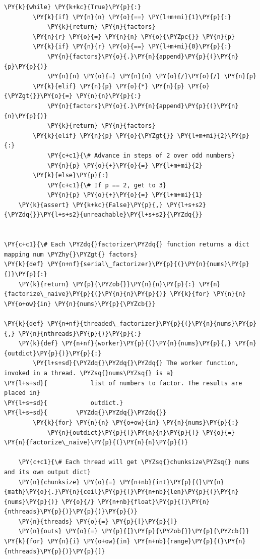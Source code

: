 \begin{Verbatim}[label=\makebox{\url{https://github.com/lucabaldini/cmepda/tree/master/slides/latex/snippets/benchmark_comparison.py}},commandchars=\\\{\}]
    \PY{k}{while} \PY{k+kc}{True}\PY{p}{:}
        \PY{k}{if} \PY{n}{n} \PY{o}{==} \PY{l+m+mi}{1}\PY{p}{:}
            \PY{k}{return} \PY{n}{factors}
        \PY{n}{r} \PY{o}{=} \PY{n}{n} \PY{o}{\PYZpc{}} \PY{n}{p}
        \PY{k}{if} \PY{n}{r} \PY{o}{==} \PY{l+m+mi}{0}\PY{p}{:}
            \PY{n}{factors}\PY{o}{.}\PY{n}{append}\PY{p}{(}\PY{n}{p}\PY{p}{)}
            \PY{n}{n} \PY{o}{=} \PY{n}{n} \PY{o}{/}\PY{o}{/} \PY{n}{p}
        \PY{k}{elif} \PY{n}{p} \PY{o}{*} \PY{n}{p} \PY{o}{\PYZgt{}}\PY{o}{=} \PY{n}{n}\PY{p}{:}
            \PY{n}{factors}\PY{o}{.}\PY{n}{append}\PY{p}{(}\PY{n}{n}\PY{p}{)}
            \PY{k}{return} \PY{n}{factors}
        \PY{k}{elif} \PY{n}{p} \PY{o}{\PYZgt{}} \PY{l+m+mi}{2}\PY{p}{:}
            \PY{c+c1}{\# Advance in steps of 2 over odd numbers}
            \PY{n}{p} \PY{o}{+}\PY{o}{=} \PY{l+m+mi}{2}
        \PY{k}{else}\PY{p}{:}
            \PY{c+c1}{\# If p == 2, get to 3}
            \PY{n}{p} \PY{o}{+}\PY{o}{=} \PY{l+m+mi}{1}
    \PY{k}{assert} \PY{k+kc}{False}\PY{p}{,} \PY{l+s+s2}{\PYZdq{}}\PY{l+s+s2}{unreachable}\PY{l+s+s2}{\PYZdq{}}


\PY{c+c1}{\# Each \PYZdq{}factorizer\PYZdq{} function returns a dict mapping num \PYZhy{}\PYZgt{} factors}
\PY{k}{def} \PY{n+nf}{serial\_factorizer}\PY{p}{(}\PY{n}{nums}\PY{p}{)}\PY{p}{:}
    \PY{k}{return} \PY{p}{\PYZob{}}\PY{n}{n}\PY{p}{:} \PY{n}{factorize\_naive}\PY{p}{(}\PY{n}{n}\PY{p}{)} \PY{k}{for} \PY{n}{n} \PY{o+ow}{in} \PY{n}{nums}\PY{p}{\PYZcb{}}

\PY{k}{def} \PY{n+nf}{threaded\_factorizer}\PY{p}{(}\PY{n}{nums}\PY{p}{,} \PY{n}{nthreads}\PY{p}{)}\PY{p}{:}
    \PY{k}{def} \PY{n+nf}{worker}\PY{p}{(}\PY{n}{nums}\PY{p}{,} \PY{n}{outdict}\PY{p}{)}\PY{p}{:}
        \PY{l+s+sd}{\PYZdq{}\PYZdq{}\PYZdq{} The worker function, invoked in a thread. \PYZsq{}nums\PYZsq{} is a}
\PY{l+s+sd}{            list of numbers to factor. The results are placed in}
\PY{l+s+sd}{            outdict.}
\PY{l+s+sd}{        \PYZdq{}\PYZdq{}\PYZdq{}}
        \PY{k}{for} \PY{n}{n} \PY{o+ow}{in} \PY{n}{nums}\PY{p}{:}
            \PY{n}{outdict}\PY{p}{[}\PY{n}{n}\PY{p}{]} \PY{o}{=} \PY{n}{factorize\_naive}\PY{p}{(}\PY{n}{n}\PY{p}{)}

    \PY{c+c1}{\# Each thread will get \PYZsq{}chunksize\PYZsq{} nums and its own output dict}
    \PY{n}{chunksize} \PY{o}{=} \PY{n+nb}{int}\PY{p}{(}\PY{n}{math}\PY{o}{.}\PY{n}{ceil}\PY{p}{(}\PY{n+nb}{len}\PY{p}{(}\PY{n}{nums}\PY{p}{)} \PY{o}{/} \PY{n+nb}{float}\PY{p}{(}\PY{n}{nthreads}\PY{p}{)}\PY{p}{)}\PY{p}{)}
    \PY{n}{threads} \PY{o}{=} \PY{p}{[}\PY{p}{]}
    \PY{n}{outs} \PY{o}{=} \PY{p}{[}\PY{p}{\PYZob{}}\PY{p}{\PYZcb{}} \PY{k}{for} \PY{n}{i} \PY{o+ow}{in} \PY{n+nb}{range}\PY{p}{(}\PY{n}{nthreads}\PY{p}{)}\PY{p}{]}


\end{Verbatim}
